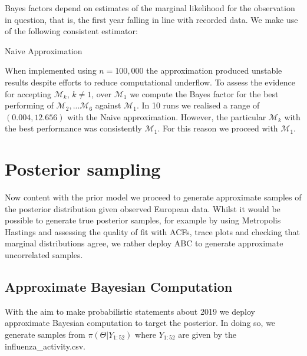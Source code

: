 \documentclass{article}
\makeatletter
\def\BState{\State\hskip-\ALG@thistlm}
\makeatother
\begin{document}
Bayes factors depend on estimates of the marginal likelihood for the observation in question, that is, the first year falling in line with recorded data. We make use of the following consistent estimator:

\begin{algorithm}
\caption{Naive Approximation}\label{euclid}
\end{algorithm}

When implemented using $n=100,000$ the approximation produced unstable results despite efforts to reduce computational underflow. To assess the evidence for accepting $\mathcal{M}_{k}$, $k\neq 1$, over $\mathcal{M}_{1}$ we compute the Bayes factor for the best performing of  $\mathcal{M}_{2},...\mathcal{M}_{6}$ against $\mathcal{M}_{1}$. In 10 runs we realised a range of $(0.004,12.656)$ with the Naive approximation. However, the particular $\mathcal{M}_{k}$ with the best performance was consistently $\mathcal{M}_{1}$. For this reason we proceed with $\mathcal{M}_{1}$.


\section{Posterior sampling}

Now content with the prior model we proceed to generate approximate samples of the posterior distribution given observed European data. Whilst it would be possible to generate true posterior samples, for example by using Metropolis Hastings and assessing the quality of fit with ACFs, trace plots and checking that marginal distributions agree, we rather deploy ABC to generate approximate uncorrelated samples. 

\subsection{Approximate Bayesian Computation}

With the aim to make probabilistic statements about 2019 we deploy approximate Bayesian computation to target the posterior. In doing so, we generate samples from $\pi(\Theta|Y_{1:52})$ where $Y_{1:52}$ are given by the influenza\_activity.csv.
\end{document}
